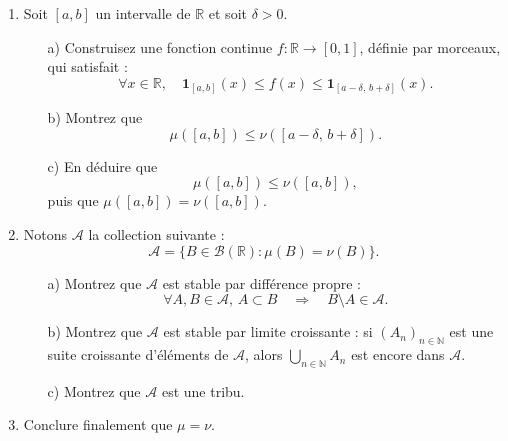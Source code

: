 \documentclass[12pt,a4paper]{article}
\begin{document}
\begin{enumerate}
    \item Soit $[a,b]$ un intervalle de $\mathbb{R}$ et soit $\delta > 0$.
    \begin{enumerate}
        \item[a)] Construisez une fonction continue $f : \mathbb{R} \to [0,1]$, définie par morceaux, qui satisfait :
        \[
        \forall x \in \mathbb{R}, \quad \mathbf{1}_{[a,b]}(x) \leq f(x) \leq \mathbf{1}_{[a-\delta, \, b+\delta]}(x).
        \]
        
        \item[b)] Montrez que
        \[
        \mu([a,b]) \leq \nu([a-\delta, \, b+\delta]).
        \]
        
        \item[c)] En déduire que
        \[
        \mu([a,b]) \leq \nu([a,b]),
        \]
        puis que $\mu([a,b]) = \nu([a,b])$.
    \end{enumerate}
    
    \item Notons $\mathcal{A}$ la collection suivante :
    \[
    \mathcal{A} = \{ B \in \mathcal{B}(\mathbb{R}) : \mu(B) = \nu(B) \}.
    \]
    \begin{enumerate}
        \item[a)] Montrez que $\mathcal{A}$ est stable par différence propre :
        \[
        \forall A,B \in \mathcal{A}, \, A \subset B \quad \Rightarrow \quad B \setminus A \in \mathcal{A}.
        \]
        
        \item[b)] Montrez que $\mathcal{A}$ est stable par limite croissante : si $(A_n)_{n \in \mathbb{N}}$ est une suite croissante d’éléments de $\mathcal{A}$, alors $\bigcup_{n \in \mathbb{N}} A_n$ est encore dans $\mathcal{A}$.
        
        \item[c)] Montrez que $\mathcal{A}$ est une tribu.
    \end{enumerate}
    
    \item Conclure finalement que $\mu = \nu$.
\end{enumerate}
\end{document}
